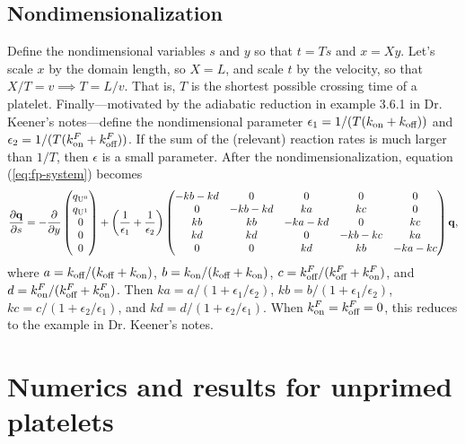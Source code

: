 \documentclass{article}
\newcommand{\tn}{\textnormal}
\newcommand{\Pder}[2]{\frac{\partial #1}{\partial #2}}
\begin{document}
\subsection{Nondimensionalization}
\label{sec:nondim}

Define the nondimensional variables $s$ and $y$ so that $t = Ts$ and
$x = Xy$. Let's scale $x$ by the domain length, so $X = L$, and scale
$t$ by the velocity, so that $X/T = v \implies T = L/v$. That is, $T$
is the shortest possible crossing time of a
platelet. Finally---motivated by the adiabatic reduction in example
3.6.1 in Dr. Keener's notes---define the nondimensional parameter
$\epsilon_1 = 1/(T(k_\tn{on} + k_\tn{off}))$ and
$\epsilon_2 = 1/(T(k_\tn{on}^F + k_\tn{off}^F))$. If the sum of the
(relevant) reaction rates is much larger than $1/T$, then $\epsilon$
is a small parameter. After the nondimensionalization, equation
(\ref{eq:fp-system}) becomes
\begin{equation}
  \label{eq:nd-system}
  \Pder{\mathbf{q}}{s} = -\Pder{}{y}
  \begin{pmatrix}
    q_{\tn{U}^0} \\ q_{\tn{U}^1} \\ 0 \\ 0 \\ 0
  \end{pmatrix}
  + \left(\frac{1}{\epsilon_1} + \frac{1}{\epsilon_2}\right)
  \begin{pmatrix}
    - kb - kd & 0 & 0 & 0 & 0 \\
    0 & - kb - kd & ka & kc & 0 \\
    kb & kb & - ka - kd & 0 & kc \\
    kd & kd & 0 & - kb - kc & ka \\
    0 & 0 & kd & kb & - ka - kc
  \end{pmatrix}
  \mathbf{q},
\end{equation}
where $a = k_\tn{off}/(k_\tn{off} + k_\tn{on})$,
$b = k_\tn{on}/(k_\tn{off} + k_\tn{on})$,
$c = k_\tn{off}^F/(k_\tn{off}^F + k_\tn{on}^F)$, and
$d = k_\tn{on}^F/(k_\tn{off}^F + k_\tn{on}^F)$. Then
$ka = a/(1 + \epsilon_1/\epsilon_2)$,
$kb = b/(1 + \epsilon_1/\epsilon_2)$,
$kc = c/(1 + \epsilon_2/\epsilon_1)$, and
$kd = d/(1 + \epsilon_2/\epsilon_1)$. When
$k_\tn{on}^F = k_\tn{off}^F = 0$, this reduces to the example in
Dr. Keener's notes.

\section{Numerics and results for unprimed platelets}
\label{sec:res-unpr}
\end{document}
